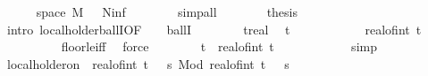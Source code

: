 \begin{isabellebody}
\ \isamarkupfalse%
\ {\isasymomega}{\isacharcolon}{\kern0pt}\ {\isachardoublequoteopen}{\isasymomega}\ {\isasymin}\ space\ {\isacharquery}{\kern0pt}M{\isachardoublequoteclose}\ {\isachardoublequoteopen}{\isasymomega}\ {\isasymnotin}\ N{\isacharunderscore}{\kern0pt}inf{\isachardoublequoteclose}\isanewline
\ \ \ \ \ \ \isamarkupfalse%
\ simp{\isacharunderscore}{\kern0pt}all\isanewline
\ \ \ \ \isamarkupfalse%
\ \isamarkupfalse%
\ {\isacharquery}{\kern0pt}thesis\isanewline
\ \ \ \ \isamarkupfalse%
\ {\isacharparenleft}{\kern0pt}intro\ local{\isacharunderscore}{\kern0pt}holder{\isacharunderscore}{\kern0pt}ballI{\isacharbrackleft}{\kern0pt}OF\ {\isacartoucheopen}{\isasymgamma}\ {\isasymin}\ {\isacharbraceleft}{\kern0pt}{}{\isacharless}{\kern0pt}{\isachardot}{\kern0pt}{\isachardot}{\kern0pt}{}{\isacharbraceright}{\kern0pt}{\isacartoucheclose}{\isacharbrackright}{\kern0pt}\ ballI{\isacharparenright}{\kern0pt}\isanewline
\ \ \ \ \ \ \isamarkupfalse%
\ t{\isacharcolon}{\kern0pt}{\isacharcolon}{\kern0pt}real\ \isamarkupfalse%
\ {\isachardoublequoteopen}t\ {\isasymin}\ {\isacharbraceleft}{\kern0pt}{}{\isachardot}{\kern0pt}{\isachardot}{\kern0pt}{\isacharbraceright}{\kern0pt}{\isachardoublequoteclose}\isanewline
\ \ \ \ \ \ \isamarkupfalse%
\ \isamarkupfalse%
\ {\isachardoublequoteopen}real{\isacharunderscore}{\kern0pt}of{\isacharunderscore}{\kern0pt}int\ {\isasymlfloor}t{\isasymrfloor}\ {\isacharplus}{\kern0pt}\ {}\ {\isachargreater}{\kern0pt}\ {}{\isachardoublequoteclose}\isanewline
\ \ \ \ \ \ \ \ \isamarkupfalse%
\ floor{\isacharunderscore}{\kern0pt}le{\isacharunderscore}{\kern0pt}iff\ \isamarkupfalse%
\ force\isanewline
\ \ \ \ \ \ \isamarkupfalse%
\ {\isachardoublequoteopen}t\ {\isacharless}{\kern0pt}\ real{\isacharunderscore}{\kern0pt}of{\isacharunderscore}{\kern0pt}int\ {\isasymlfloor}t{\isasymrfloor}\ {\isacharplus}{\kern0pt}\ {}{\isachardoublequoteclose}\isanewline
\ \ \ \ \ \ \ \ \isamarkupfalse%
\ simp\isanewline
\ \ \ \ \ \ \isamarkupfalse%
\ \isamarkupfalse%
\ {\isachardoublequoteopen}local{\isacharunderscore}{\kern0pt}holder{\isacharunderscore}{\kern0pt}on\ {\isasymgamma}\ {\isacharbraceleft}{\kern0pt}{}{\isachardot}{\kern0pt}{\isachardot}{\kern0pt}real{\isacharunderscore}{\kern0pt}of{\isacharunderscore}{\kern0pt}int\ {\isasymlfloor}t{\isasymrfloor}\ {\isacharplus}{\kern0pt}\ {}{\isacharbraceright}{\kern0pt}\ {\isacharparenleft}{\kern0pt}{\isasymlambda}s{\isachardot}{\kern0pt}\ Mod\ {\isacharparenleft}{\kern0pt}real{\isacharunderscore}{\kern0pt}of{\isacharunderscore}{\kern0pt}int\ {\isasymlfloor}t{\isasymrfloor}\ {\isacharplus}{\kern0pt}\ {}{\isacharparenright}{\kern0pt}\ s\ {\isasymomega}{\isacharparenright}{\kern0pt}{\isachardoublequoteclose}\isanewline

\end{isabellebody}
